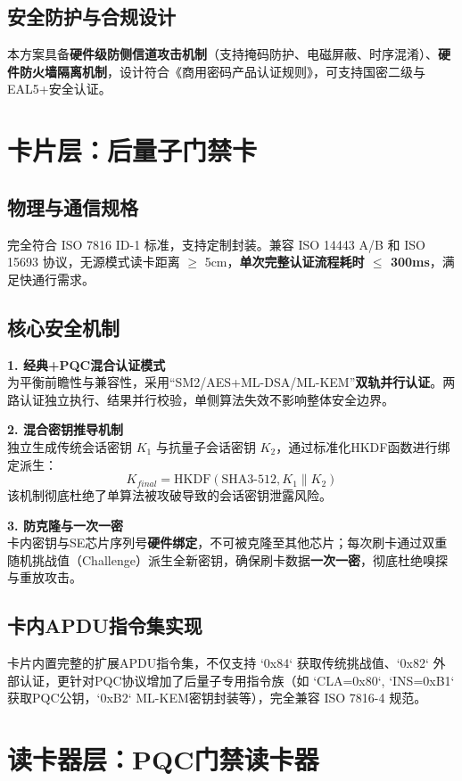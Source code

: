 \subsection{安全防护与合规设计}
本方案具备\textbf{硬件级防侧信道攻击机制}（支持掩码防护、电磁屏蔽、时序混淆）、\textbf{硬件防火墙隔离机制}，设计符合《商用密码产品认证规则》，可支持国密二级与EAL5+安全认证。

\section{卡片层：后量子门禁卡}

\subsection{物理与通信规格}
完全符合 ISO 7816 ID-1 标准，支持定制封装。兼容 ISO 14443 A/B 和 ISO 15693 协议，无源模式读卡距离 $\ge$ 5cm，\textbf{单次完整认证流程耗时 $\le$ 300ms}，满足快通行需求。

\subsection{核心安全机制}

\textbf{1. 经典+PQC混合认证模式} \\
为平衡前瞻性与兼容性，采用“SM2/AES+ML-DSA/ML-KEM”\textbf{双轨并行认证}。两路认证独立执行、结果并行校验，单侧算法失效不影响整体安全边界。

\textbf{2. 混合密钥推导机制} \\
独立生成传统会话密钥 $K_1$ 与抗量子会话密钥 $K_2$，通过标准化HKDF函数进行绑定派生：
\[ K_{final} = \text{HKDF}(\text{SHA3-512}, K_1 \parallel K_2) \]
该机制彻底杜绝了单算法被攻破导致的会话密钥泄露风险。

\textbf{3. 防克隆与一次一密} \\
卡内密钥与SE芯片序列号\textbf{硬件绑定}，不可被克隆至其他芯片；每次刷卡通过双重随机挑战值（Challenge）派生全新密钥，确保刷卡数据\textbf{一次一密}，彻底杜绝嗅探与重放攻击。

\subsection{卡内APDU指令集实现}
卡片内置完整的扩展APDU指令集，不仅支持 `0x84` 获取传统挑战值、`0x82` 外部认证，更针对PQC协议增加了后量子专用指令族（如 `CLA=0x80`, `INS=0xB1` 获取PQC公钥，`0xB2` ML-KEM密钥封装等），完全兼容 ISO 7816-4 规范。

\section{读卡器层：PQC门禁读卡器}

